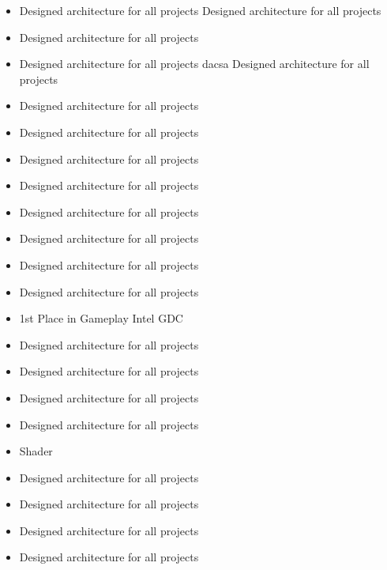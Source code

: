 
\begin{itemize}
	\item Designed architecture for all projects Designed architecture for all projects
	\item Designed architecture for all projects
	\item Designed architecture for all projects dacsa Designed architecture for all projects
	\item Designed architecture for all projects
	\item Designed architecture for all projects
	\item Designed architecture for all projects
\end{itemize}

\divider

\begin{itemize}
	\item Designed architecture for all projects
	\item Designed architecture for all projects
	\item Designed architecture for all projects
	\item Designed architecture for all projects
	\item Designed architecture for all projects
\end{itemize}

\divider

\begin{itemize}
	
	\item 1st Place in Gameplay Intel GDC
	\item Designed architecture for all projects
	\item Designed architecture for all projects
	\item Designed architecture for all projects
	\item Designed architecture for all projects
\end{itemize}

\divider

\begin{itemize}
	
	\item Shader
	\item Designed architecture for all projects
	\item Designed architecture for all projects
	\item Designed architecture for all projects
	\item Designed architecture for all projects
\end{itemize}



\nocite{*}
